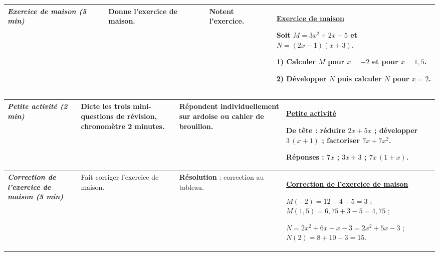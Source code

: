 \documentclass[10pt]{article}
\newcommand{\titreR}[1]{\underline{\textcolor{rougetitre}{\bfseries #1}}}
\newcommand{\maison}{\underline{\textcolor{rougemaison}{\bfseries Exercice de maison}}}
\newcommand{\seance}[1]{\fcolorbox{bleuseance}{bleufond}{\textcolor{bleuseance}{\bfseries #1}}}
\newcommand{\moment}[1]{\textbf{\itshape #1}}
\begin{document}
\begin{longtable}{|p{2.35cm}|p{5.35cm}|p{4.55cm}|p{13.85cm}|}
\moment{Exercice de maison (5 min)} &
Donne l'exercice de maison. &
Notent l'exercice. &
\maison \par
Soit $M=3x^2+2x-5$ et $N=(2x-1)(x+3)$. \par
\textbf{1)} Calculer $M$ pour $x=-2$ et pour $x=1{,}5$. \par
\textbf{2)} Développer $N$ puis calculer $N$ pour $x=2$. \\ \hline
\end{longtable}

\begin{longtable}{|p{2.35cm}|p{5.35cm}|p{4.55cm}|p{13.85cm}|}
\hline
\seance{SEANCE 6} \newline \moment{Petite activité (2 min)} &
Dicte les trois mini-questions de révision, chronomètre 2 minutes. &
Répondent individuellement sur ardoise ou cahier de brouillon. &
\titreR{Petite activité} \par
De tête : réduire $2x+5x$ ; développer $3\,(x+1)$ ; factoriser $7x+7x^2$. \par
\textbf{Réponses :} $7x$ ; \; $3x+3$ ; \; $7x\,(1+x)$. \\ \hline

\moment{Correction de l'exercice de maison (5 min)} &
Fait corriger l'exercice de maison. &
\textbf{Résolution} : correction au tableau. &
\titreR{Correction de l'exercice de maison} \par
$M(-2)=12-4-5=3$ ; \; $M(1{,}5)=6{,}75+3-5=4{,}75$ ; \par
$N=2x^2+6x-x-3=2x^2+5x-3$ ; \; $N(2)=8+10-3=15$. \\ \hline


\end{longtable}
\end{document}
